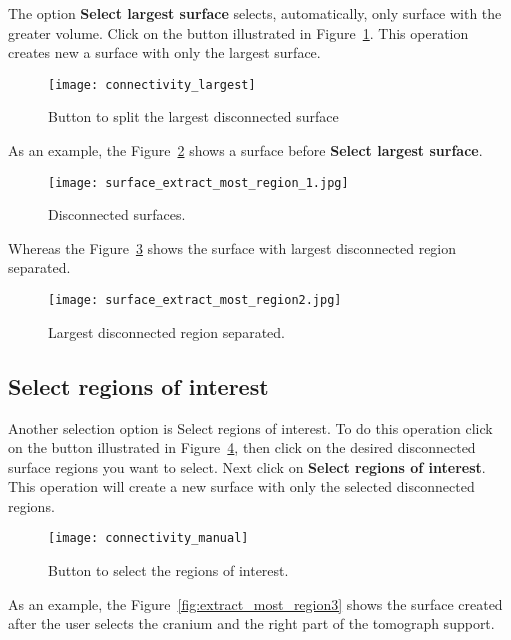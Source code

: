 The option \textbf{Select largest surface} selects, automatically, only surface with the greater volume. Click on the button illustrated in Figure~\ref{fig:short_connectivity_largest}. This operation creates new a surface with only the largest surface.


\begin{figure}[!htb]
\centering
\texttt{[image: connectivity\_largest]}
\caption{Button to split the largest disconnected surface}
\label{fig:short_connectivity_largest}
\end{figure}

As an example, the Figure~\ref{fig:extract_most_region_1} shows a surface before \textbf{Select largest surface}.

\begin{figure}[!htb]
\centering
\texttt{[image: surface\_extract\_most\_region\_1.jpg]}
\caption{Disconnected surfaces.}
\label{fig:extract_most_region_1}
\end{figure}

Whereas the Figure~\ref{fig:extract_most_region2} shows the surface with largest disconnected region separated.

\begin{figure}[!htb]
\centering
\texttt{[image: surface\_extract\_most\_region2.jpg]}
\caption{Largest disconnected region separated.}
\label{fig:extract_most_region2}
\end{figure}

\newpage

\subsection{Select regions of interest}

Another selection option is Select regions of interest. To do this operation click on the button illustrated in Figure~\ref{fig:short_connectivity_manual}, then click on the desired disconnected surface regions you want to select. Next click on \textbf{Select regions of interest}. This operation will create a new surface with only the selected disconnected regions.

\begin{figure}[!htb]
\centering
\texttt{[image: connectivity\_manual]}
\caption{Button to select the regions of interest.}
\label{fig:short_connectivity_manual}
\end{figure}

As an example, the Figure~\ref{fig:extract_most_region3} shows the surface created after the user selects the cranium and the right part of the tomograph support.

